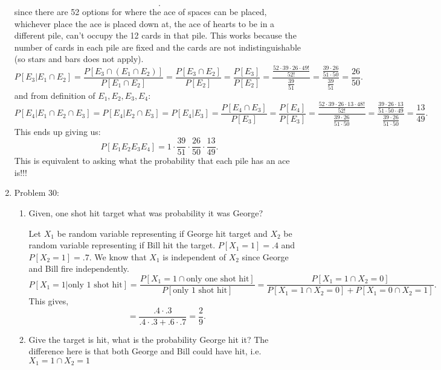 \documentclass[a4paper]{article}
\begin{document}
\begin{enumerate}
\begin{note}
\[      .\] 
      since there are 52 options for where the ace of spaces can be placed, whichever place the ace is placed down at,
      the ace of hearts to be in a different pile, can't occupy the 12 cards in that pile. This works because
      the number of cards in each pile are fixed and the cards are not indistinguishable (so stars and bars 
      does not apply). 
      \[
        P[E_3 | E_1 \cap E_2] = \frac{P[E_3 \cap \left( E_1 \cap E_2 \right)] }{P[E_1 \cap E_2]} 
        = \frac{P[E_3 \cap E_2]}{P[E_2]} = \frac{P[E_3]}{P[E_2]} = \frac{\frac{52 \cdot 39 \cdot 26 \cdot 49!}{52!}}{\frac{39}{51}}
        = \frac{\frac{39 \cdot 26}{51 \cdot 50}}{\frac{39}{51}} = \frac{26}{50}
      .\] 
      and from definition of $E_1,E_2,E_3,E_4$:
      \[
        P[E_4 | E_1 \cap E_2 \cap E_3] = P[E_4 | E_2 \cap E_3] = P[E_4 | E_3] =
        \frac{P[E_4 \cap E_3]}{P[E_3]} = \frac{P[E_4]}{P[E_3]} = \frac{\frac{52 \cdot 39 \cdot 26 \cdot 13 \cdot 48!}{52!}}{
        \frac{39 \cdot 26}{51 \cdot 50}} =  \frac{\frac{39 \cdot 26 \cdot 13}{51 \cdot 50 \cdot 49}}{\frac{39 \cdot 26}{51 \cdot 50}}
        = \frac{13}{49} 
      .\]
      This ends up giving us:
      \[
        P[E_1 E_2 E_3 E_4] = 1 \cdot \frac{39}{51} \cdot \frac{26}{50} \cdot \frac{13}{49} 
      .\]
      This is equivalent to asking what the probability that each pile has an ace is!!!
    \end{note}
  \item Problem 30:
    \begin{enumerate}
      \item Given, one shot hit target what was probability it was George?
        \begin{note}
          Let $X_1$ be random variable representing if George hit target and  $X_2$ be random variable representing
          if Bill hit the target.  $P[X_1 = 1] = .4$ and  $P[X_2=1]=.7$. We know that $X_1$ is independent of  $X_2$
          since George and Bill fire independently.
          \[
            P[X_1 = 1| \text{only 1 shot hit}] = \frac{P[X_1 = 1 \cap \text{only one shot hit}]}{P[\text{only 1 shot hit}]}
            = \frac{P[X_1=1 \cap X_2 =0]}{P[X_1=1 \cap X_2=0] + P[X_1 =0 \cap X_2 =1]}
          .\] 
          This gives,
          \[
          = \frac{.4 \cdot .3}{.4 \cdot .3 + .6 \cdot .7} = \frac{2}{9}
          .\] 
        \end{note}
      \item Give the target is hit, what is the probability George hit it?
        The difference here is that both George and Bill could have hit, i.e. $X_1 =1 \cap X_2=1$

\end{enumerate}
\end{enumerate}
\end{document}

